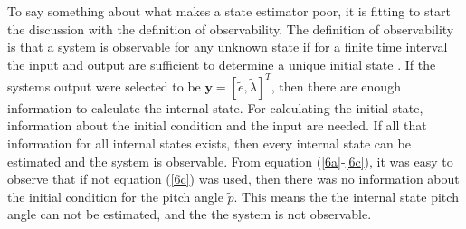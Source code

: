 To say something about what makes a state estimator poor, it is fitting to start the discussion with the definition of observability. The definition of observability is that a system is observable for any unknown state if for a finite time interval the input and output are sufficient to determine a unique initial state \cite{syllabus}. If the systems output were selected to be $\boldsymbol{y} = [\tilde{e}, \tilde{\lambda}]^T$, then there are enough information to calculate the internal state. For calculating the initial state, information about the initial condition and the input are needed. If all that information for all internal states exists, then every internal state can be estimated and the system is observable. From equation (\ref{6a}-\ref{6c}), it was easy to observe that if not equation (\ref{6c}) was used, then there was no information about the initial condition for the pitch angle $\tilde{p}$. This means the the internal state pitch angle can not be estimated, and the the system is not observable. 